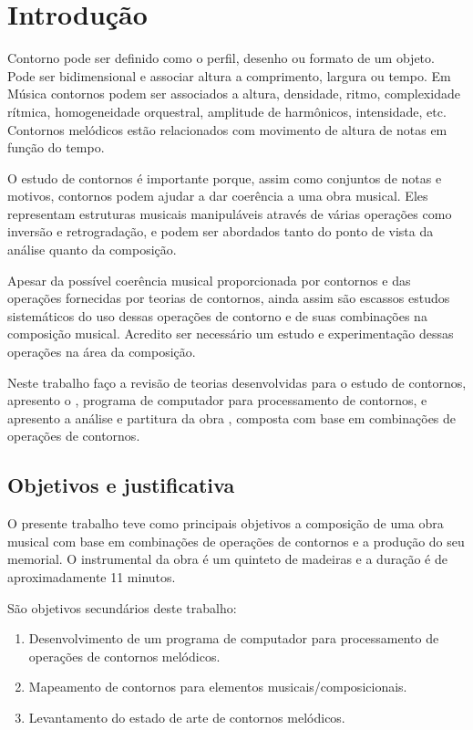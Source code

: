 \chapter{Introdução}
\label{cha:introducao}

Contorno pode ser definido como o perfil, desenho ou formato de um
objeto. Pode ser bidimensional e associar altura a comprimento,
largura ou tempo. Em Música contornos podem ser associados a altura,
densidade, ritmo, complexidade rítmica, homogeneidade orquestral,
amplitude de harmônicos, intensidade, etc. Contornos melódicos estão
relacionados com movimento de altura de notas em função do tempo.

O estudo de contornos é importante porque, assim como conjuntos de
notas e motivos, contornos podem ajudar a dar coerência a uma obra
musical. Eles representam estruturas musicais manipuláveis através de
várias operações como inversão e retrogradação, e podem ser abordados
tanto do ponto de vista da análise quanto da composição.

Apesar da possível coerência musical proporcionada por contornos e das
operações fornecidas por teorias de contornos, ainda assim são
escassos estudos sistemáticos do uso dessas operações de contorno e de
suas combinações na composição musical. Acredito ser necessário um
estudo e experimentação dessas operações na área da composição.

Neste trabalho faço a revisão de teorias desenvolvidas para o estudo
de contornos, apresento o \goiaba{}, programa de computador para
processamento de contornos, e apresento a análise e partitura da obra
\obra{}, composta com base em combinações de operações de contornos.

\section{Objetivos e justificativa}
\label{sec:objet-e-just}

O presente trabalho teve como principais objetivos a composição de uma
obra musical com base em combinações de operações de contornos e a
produção do seu memorial. O instrumental da obra é um quinteto de
madeiras e a duração é de aproximadamente 11 minutos.

São objetivos secundários deste trabalho:

\begin{enumerate}
\item Desenvolvimento de um programa de computador para processamento
  de operações de contornos melódicos.
\item Mapeamento de contornos para elementos musicais/composicionais.
\item Levantamento do estado de arte de contornos melódicos.
\end{enumerate}

